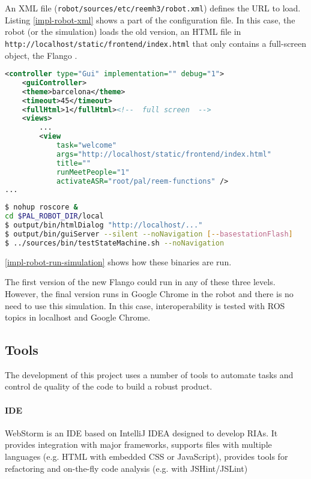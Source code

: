 An \ac{XML} file (\texttt{robot/sources/etc/reemh3/robot.xml}) defines the \ac{URL} to load.
Listing \ref{impl-robot-xml} shows a part of the configuration file.
In this case, the robot (or the simulation) loads the old version, an \ac{HTML} file in \texttt{http://localhost/static/frontend/index.html} that only contains a full-screen \flash object, the Flango \cm .
\begin{lstlisting}[language=xml,caption=Robot configuration file, label=impl-robot-xml]
<controller type="Gui" implementation="" debug="1">
    <guiController>
    <theme>barcelona</theme>
    <timeout>45</timeout>
    <fullHtml>1</fullHtml><!--  full screen  -->
    <views>
        ...
        <view
            task="welcome" 
            args="http://localhost/static/frontend/index.html" 
            title="" 
            runMeetPeople="1"  
            activateASR="root/pal/reem-functions" />
...    
\end{lstlisting}

\begin{lstlisting}[language=bash,caption=Run robot simulation, label=impl-robot-run-simulation]
$ nohup roscore &
cd $PAL_ROBOT_DIR/local
$ output/bin/htmlDialog "http://localhost/..."
$ output/bin/guiServer --silent --noNavigation [--basestationFlash]
$ ../sources/bin/testStateMachine.sh --noNavigation
\end{lstlisting}

\ref{impl-robot-run-simulation} shows how these binaries are run.

The first version of the new Flango \cm could run in any of these three levels.
However, the final version runs in Google Chrome in the robot and there is no need to use this simulation.
In this case, interoperability is tested with \ac{ROS} topics in localhost and Google Chrome.

\subsection{Tools}
The development of this project uses a number of tools to automate tasks and control de quality of the code to build a robust product.

\paragraph{\ac{IDE}} WebStorm is an \ac{IDE} based on IntelliJ IDEA designed to develop \acp{RIA}.
It provides integration with major frameworks, supports files with multiple languages (e.g. HTML with embedded \ac{CSS} or JavaScript), provides tools for refactoring and on-the-fly code analysis (e.g. with JSHint/JSLint)

